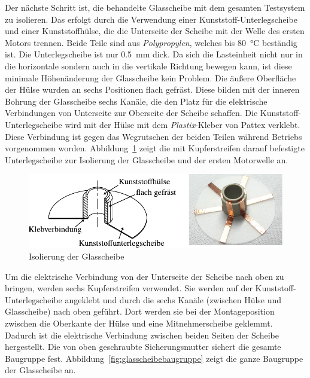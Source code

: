 Der nächste Schritt ist, die behandelte Glasscheibe mit dem gesamten Testsystem zu isolieren.
Das erfolgt durch die Verwendung einer Kunststoff-Unterlegscheibe und einer Kunststoffhülse, die die Unterseite der Scheibe mit der Welle des ersten Motors trennen.
Beide Teile sind aus \textit{Polypropylen}, welches bis \SI{80}{\degreeCelsius} beständig ist.
Die Unterlegscheibe ist nur \SI{0.5}{\milli\meter} dick.
Da sich die Lasteinheit nicht nur in die horizontale sondern auch in die vertikale Richtung bewegen kann, ist diese minimale Höhenänderung der Glasscheibe kein Problem.
Die äußere Oberfläche der Hülse wurden an sechs Positionen flach gefräst.
Diese bilden mit der inneren Bohrung der Glasscheibe sechs Kanäle, die den Platz für die elektrische Verbindungen von Unterseite zur Oberseite der Scheibe schaffen.
Die Kunststoff-Unterlegscheibe wird mit der Hülse mit dem \textit{Plastix}-Kleber von Pattex verklebt.
Diese Verbindung ist gegen das Wegrutschen der beiden Teilen während Betriebs vorgenommen worden.
Abbildung~\ref{fig:isolierung_der_glassscheibe} zeigt die mit Kupferstreifen darauf befestigte Unterlegscheibe zur Isolierung der Glasscheibe und der ersten Motorwelle an.

\begin{figure}[htb]
    \centering
    \includegraphics[]{./images/isolierung_der_scheibe.pdf}
    \caption{Isolierung der Glasscheibe}
    \label{fig:isolierung_der_glassscheibe}
\end{figure}

Um die elektrische Verbindung von der Unterseite der Scheibe nach oben zu bringen, werden sechs Kupferstreifen verwendet.
Sie werden auf der Kunststoff-Unterlegscheibe angeklebt und durch die sechs Kanäle (zwischen Hülse und Glasscheibe) nach oben geführt.
Dort werden sie bei der Montageposition zwischen die Oberkante der Hülse und eine Mitnehmerscheibe geklemmt.
Dadurch ist die elektrische Verbindung zwischen beiden Seiten der Scheibe hergestellt.
Die von oben geschraubte Sicherungsmutter sichert die gesamte Baugruppe fest.
Abbildung~\ref{fig:glasscheibebaugruppe} zeigt die ganze Baugruppe der Glasscheibe an.


